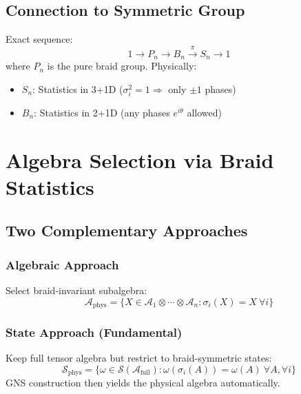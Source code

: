 \documentclass[aps,prl,reprint]{revtex4-2}
\begin{document}
\subsection{Connection to Symmetric Group}

Exact sequence: 
\begin{equation*}
1 \to P_n \to B_n \xrightarrow{\pi} S_n \to 1 
\end{equation*}
where $P_n$ is the pure braid group. Physically:

\begin{itemize}
\item $S_n$: Statistics in 3+1D ($\sigma_i^2 = 1 \Rightarrow$ only $\pm 1$
phases)

\item $B_n$: Statistics in 2+1D (any phases $e^{i\theta}$ allowed)
\end{itemize}

\section{Algebra Selection via Braid Statistics}

\subsection{Two Complementary Approaches}

\subsubsection{Algebraic Approach}

Select braid-invariant subalgebra: 
\begin{equation*}
\mathcal{A}_{\text{phys}} = \{X \in \mathcal{A}_1 \otimes \cdots \otimes 
\mathcal{A}_n : \sigma_i(X) = X \ \forall i\} 
\end{equation*}

\subsubsection{State Approach (Fundamental)}

Keep full tensor algebra but restrict to braid-symmetric states: 
\begin{equation*}
\mathcal{S}_{\text{phys}} = \{\omega \in \mathcal{S}(\mathcal{A}_{\text{full}%
}) : \omega(\sigma_i(A)) = \omega(A) \ \forall A, \forall i\} 
\end{equation*}
GNS construction then yields the physical algebra automatically.
\end{document}
